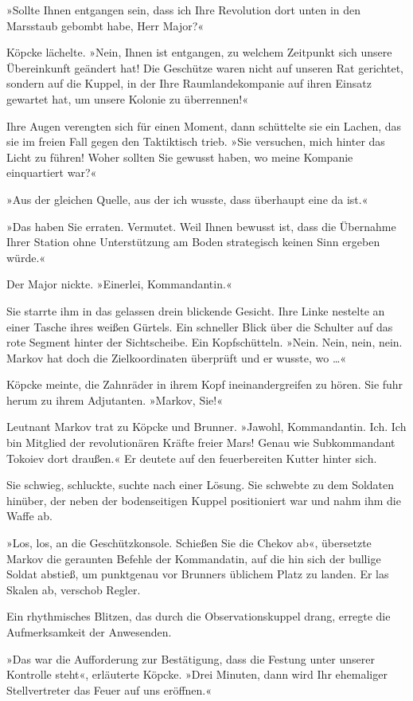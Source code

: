 »Sollte Ihnen entgangen sein, dass ich Ihre Revolution dort unten
in den Marsstaub gebombt habe, Herr Major?«

Köpcke lächelte. »Nein, Ihnen ist entgangen, zu welchem Zeitpunkt
sich unsere Übereinkunft geändert hat! Die Geschütze waren nicht
auf unseren Rat gerichtet, sondern auf die Kuppel, in der Ihre
Raumlandekompanie auf ihren Einsatz gewartet hat, um unsere Kolonie
zu überrennen!«

Ihre Augen verengten sich für einen Moment, dann schüttelte sie ein
Lachen, das sie im freien Fall gegen den Taktiktisch trieb. »Sie
versuchen, mich hinter das Licht zu führen! Woher sollten Sie
gewusst haben, wo meine Kompanie einquartiert war?«

»Aus der gleichen Quelle, aus der ich wusste, dass überhaupt eine
da ist.«

»Das haben Sie erraten. Vermutet. Weil Ihnen bewusst ist, dass die
Übernahme Ihrer Station ohne Unterstützung am Boden strategisch
keinen Sinn ergeben würde.«

Der Major nickte. »Einerlei, Kommandantin.«

Sie starrte ihm in das gelassen drein blickende Gesicht. Ihre Linke
nestelte an einer Tasche ihres weißen Gürtels. Ein schneller Blick
über die Schulter auf das rote Segment hinter der Sichtscheibe. Ein
Kopfschütteln. »Nein. Nein, nein, nein. Markov hat doch die
Zielkoordinaten überprüft und er wusste, wo …«

Köpcke meinte, die Zahnräder in ihrem Kopf ineinandergreifen zu
hören. Sie fuhr herum zu ihrem Adjutanten. »Markov, Sie!«

Leutnant Markov trat zu Köpcke und Brunner. »Jawohl, Kommandantin.
Ich. Ich bin Mitglied der revolutionären Kräfte freier Mars! Genau
wie Subkommandant Tokoiev dort draußen.« Er deutete auf den
feuerbereiten Kutter hinter sich.

Sie schwieg, schluckte, suchte nach einer Lösung. Sie schwebte zu
dem Soldaten hinüber, der neben der bodenseitigen Kuppel
positioniert war und nahm ihm die Waffe ab.

»Los, los, an die Geschützkonsole. Schießen Sie die Chekov ab«,
übersetzte Markov die geraunten Befehle der Kommandatin, auf die
hin sich der bullige Soldat abstieß, um punktgenau vor Brunners
üblichem Platz zu landen. Er las Skalen ab, verschob Regler.

Ein rhythmisches Blitzen, das durch die Observationskuppel drang,
erregte die Aufmerksamkeit der Anwesenden.

»Das war die Aufforderung zur Bestätigung, dass die Festung unter
unserer Kontrolle steht«, erläuterte Köpcke. »Drei Minuten, dann
wird Ihr ehemaliger Stellvertreter das Feuer auf uns eröffnen.«

